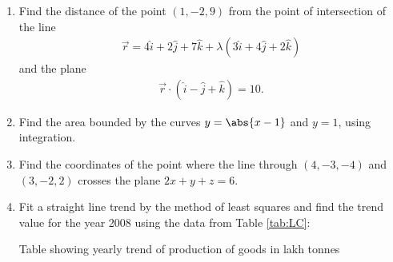 %
\begin{enumerate}
	
	\item Find the distance of the point $(1,-2,9)$ from the point of intersection of the line
		\begin{align}
			\vec{r}=4\hat{i}+2\hat{j}+7\hat{k}+\lambda(3\hat{i}+4\hat{j}+2\hat{k})
		\end{align}and the plane
		\begin{align}
			\vec{r}\cdot(\hat{i}-\hat{j}+\hat{k})=10.
		\end{align}

	\item Find the area bounded by the curves $y=\abs{x-1}$ and $y=1$, using integration.

	\item Find the coordinates of the point where the line through $(4,-3,-4)$ and $(3,-2,2)$ crosses the plane $2x+y+z=6$.

	\item Fit a straight line trend by the method of least squares and find the trend value for the year 2008 using the data from Table \ref{tab:LC}:
		\begin{table}[H]
			\caption{Table showing yearly trend of production of goods in lakh tonnes \label{tab:LC}}
			
		\end{table}
\end{enumerate}
%
